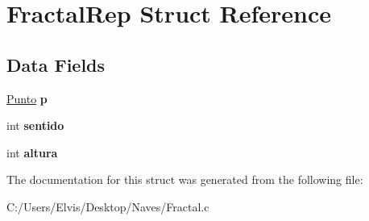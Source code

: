 \hypertarget{struct_fractal_rep}{}\section{Fractal\+Rep Struct Reference}
\label{struct_fractal_rep}
\subsection*{Data Fields}
\begin{DoxyCompactItemize}
\item 
\hyperlink{struct_punto_rep}{Punto} {\bfseries p}\hypertarget{struct_fractal_rep_a077d451cf4f462893073ae81936045f2}{}\label{struct_fractal_rep_a077d451cf4f462893073ae81936045f2}

\item 
int {\bfseries sentido}\hypertarget{struct_fractal_rep_a637d5b598b9bb27643f8f0a21b3b0191}{}\label{struct_fractal_rep_a637d5b598b9bb27643f8f0a21b3b0191}

\item 
int {\bfseries altura}\hypertarget{struct_fractal_rep_a778b6b04a3f5e4401e90b192cb05b557}{}\label{struct_fractal_rep_a778b6b04a3f5e4401e90b192cb05b557}

\end{DoxyCompactItemize}


The documentation for this struct was generated from the following file\+:\begin{DoxyCompactItemize}
\item 
C\+:/\+Users/\+Elvis/\+Desktop/\+Naves/Fractal.\+c\end{DoxyCompactItemize}
